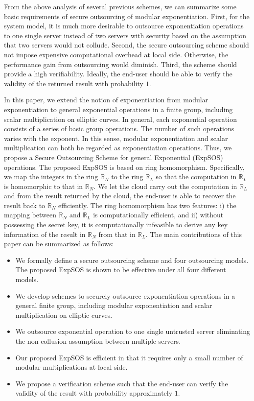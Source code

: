 \documentclass[english,draftcls,onecolumn,11pt]{IEEEtran}
\theoremstyle{definition}
\theoremstyle{plain}
\theoremstyle{plain}
\theoremstyle{definition}
\begin{document}
From the above analysis of several previous schemes, we can summarize
some basic requirements of secure outsourcing of modular exponentiation.
First, for the system model, it is much more desirable to outsource
exponentiation operations to one single server instead of two servers
with security based on the assumption that two servers would not collude.
Second, the secure outsourcing scheme should not impose expensive
computational overhead at local side. Otherwise, the performance gain
from outsourcing would diminish. Third, the scheme should provide
a high verifiability. Ideally, the end-user should be able to verify
the validity of the returned result with probability $1$.

In this paper, we extend the notion of exponentiation from modular
exponentiation to general exponential operations in a finite group,
including scalar multiplication on elliptic curves. In general, each
exponential operation consists of a series of basic group operations.
The number of such operations varies with the exponent. In this sense,
modular exponentiation and scalar multiplication can both be regarded
as exponentiation operations. Thus, we propose a Secure Outsourcing
Scheme for general Exponential (ExpSOS) operations. The proposed ExpSOS
is based on ring homomorphism. Specifically, we map the integers in
the ring $\mathbb{R}_{N}$ to the ring $\mathbb{R}_{L}$ so that the
computation in $\mathbb{R}_{L}$ is homomorphic to that in $\mathbb{R}_{N}$.
We let the cloud carry out the computation in $\mathbb{R}_{L}$ and
from the result returned by the cloud, the end-user is able to recover
the result back to $\mathbb{R}_{N}$ efficiently. The ring homomorphism
has two features: i) the mapping between $\mathbb{R}_{N}$ and $\mathbb{R}_{L}$
is computationally efficient, and ii) without possessing the secret
key, it is computationally infeasible to derive any key information
of the result in $\mathbb{R}_{N}$ from that in $\mathbb{R}_{L}$.
The main contributions of this paper can be summarized as follows:
\begin{itemize}
\item We formally define a secure outsourcing scheme and four outsourcing
models. The proposed ExpSOS is shown to be effective under all four
different models.
\item We develop schemes to securely outsource exponentiation operations
in a general finite group, including modular exponentiation and scalar
multiplication on elliptic curves.
\item We outsource exponential operation to one single untrusted server
eliminating the non-collusion assumption between multiple servers.
\item Our proposed ExpSOS is efficient in that it requires only a small
number of modular multiplications at local side. 
\item We propose a verification scheme such that the end-user can verify
the validity of the result with probability approximately $1$.
\end{itemize}
\end{document}
